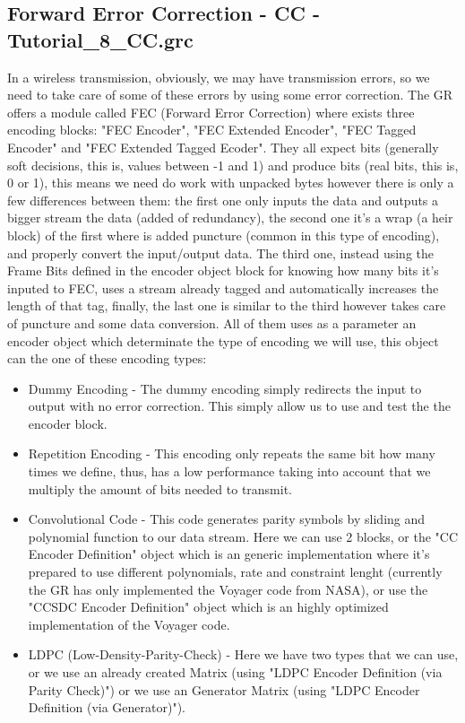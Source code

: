 \documentclass[a4paper, 10pt, conference]{ieeeconf}      %
\begin{document}
\subsection{Forward Error Correction - CC - Tutorial\_8\_CC.grc}
    In a wireless transmission, obviously, we may have transmission errors, so we need to take care of some of these errors by using some error correction. The GR offers a module called FEC (Forward Error Correction) where exists three encoding blocks: "FEC Encoder", "FEC Extended Encoder", "FEC Tagged Encoder" and "FEC Extended Tagged Ecoder". They all expect bits (generally soft decisions, this is, values between -1 and 1) and produce bits (real bits, this is, 0 or 1), this means we need do work with unpacked bytes however there is only a few differences between them: the first one only inputs the data and outputs a bigger stream the data (added of redundancy), the second one it's a wrap (a heir block) of the first where is added puncture (common in this type of encoding), and properly convert the input/output data. The third one, instead using the Frame Bits defined in the encoder object block for knowing how many bits it's inputed to FEC, uses a stream already tagged and automatically increases the length of that tag, finally, the last one is similar to the third however takes care of puncture and some data conversion. All of them uses as a parameter an encoder object which determinate the type of encoding we will use, this object can the one of these encoding types:
    \begin{itemize}
        \item Dummy Encoding - The dummy encoding simply redirects the input to output with no error correction. This simply allow us to use and test the the encoder block.
        \item Repetition Encoding - This encoding only repeats the same bit how many times we define, thus, has a low performance taking into account that we multiply the amount of bits needed to transmit.
        \item Convolutional Code - This code generates parity symbols by sliding and polynomial function to our data stream. Here we can use 2 blocks, or the "CC Encoder Definition" object which is an generic implementation where it's prepared to use different polynomials, rate and constraint lenght (currently the GR has only implemented the Voyager code from NASA), or use the "CCSDC Encoder Definition" object which is an highly optimized implementation of the Voyager code.
        \item LDPC (Low-Density-Parity-Check) - Here we have two types that we can use, or we use an already created Matrix (using "LDPC Encoder Definition (via Parity Check)") or we use an Generator Matrix (using "LDPC Encoder Definition (via Generator)").
    \end{itemize}
\end{document}
